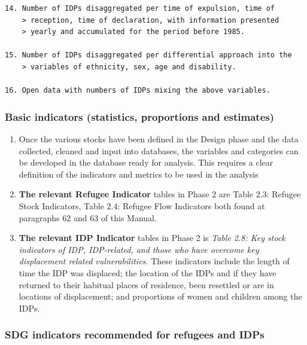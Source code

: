 \documentclass[
]{article}
\begin{document}
\begin{verbatim}
14. Number of IDPs disaggregated per time of expulsion, time of
    > reception, time of declaration, with information presented
    > yearly and accumulated for the period before 1985.

15. Number of IDPs disaggregated per differential approach into the
    > variables of ethnicity, sex, age and disability.

16. Open data with numbers of IDPs mixing the above variables.
\end{verbatim}

\hypertarget{basic-indicators-statistics-proportions-and-estimates}{%
\subsubsection{Basic indicators (statistics, proportions and estimates)}\label{basic-indicators-statistics-proportions-and-estimates}}

\begin{enumerate}
\def\labelenumi{\arabic{enumi}.}
\setcounter{enumi}{420}
\item
  Once the various stocks have been defined in the Design phase and
  the data collected, cleaned and input into databases, the variables
  and categories can be developed in the database ready for analysis.
  This requires a clear definition of the indicators and metrics to be
  used in the analysis
\item
  \textbf{The relevant Refugee Indicator} tables in Phase 2 are Table 2.3:
  Refugee Stock Indicators, Table 2.4: Refugee Flow Indicators both
  found at paragraphs 62 and 63 of this Manual.
\item
  \textbf{The relevant IDP Indicator} tables in Phase 2 is \emph{Table 2.8: Key
  stock indicators of IDP, IDP-related, and those who have overcome
  key displacement related vulnerabilities.} These indicators include
  the length of time the IDP was displaced; the location of the IDPs
  and if they have returned to their habitual places of residence,
  been resettled or are in locations of displacement; and proportions
  of women and children among the IDPs.
\end{enumerate}

\hypertarget{sdg-indicators-recommended-for-refugees-and-idps}{%
\subsubsection{SDG indicators recommended for refugees and IDPs}\label{sdg-indicators-recommended-for-refugees-and-idps}}
\end{document}
